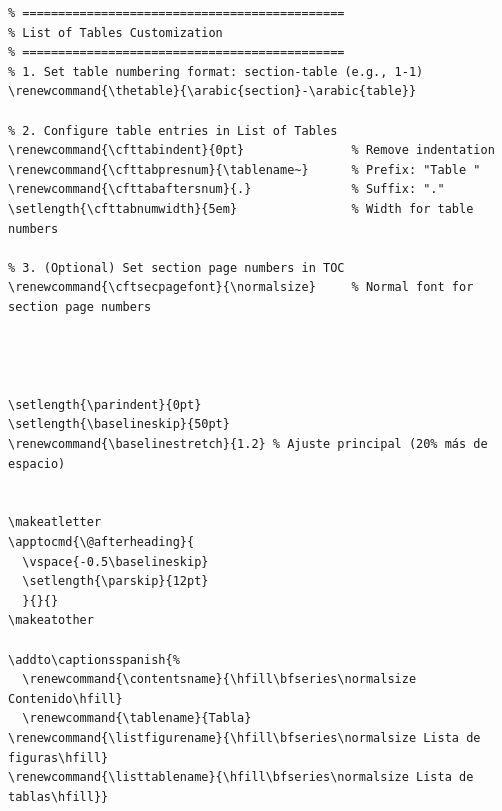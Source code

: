 \documentclass{reporti}
\begin{document}
\begin{verbatim}
% =============================================
% List of Tables Customization
% =============================================
% 1. Set table numbering format: section-table (e.g., 1-1)
\renewcommand{\thetable}{\arabic{section}-\arabic{table}}

% 2. Configure table entries in List of Tables
\renewcommand{\cfttabindent}{0pt}               % Remove indentation
\renewcommand{\cfttabpresnum}{\tablename~}      % Prefix: "Table "
\renewcommand{\cfttabaftersnum}{.}              % Suffix: "."
\setlength{\cfttabnumwidth}{5em}                % Width for table numbers

% 3. (Optional) Set section page numbers in TOC
\renewcommand{\cftsecpagefont}{\normalsize}     % Normal font for section page numbers




\setlength{\parindent}{0pt}
\setlength{\baselineskip}{50pt}
\renewcommand{\baselinestretch}{1.2} % Ajuste principal (20% más de espacio)


\makeatletter
\apptocmd{\@afterheading}{
  \vspace{-0.5\baselineskip}
  \setlength{\parskip}{12pt}
  }{}{}
\makeatother

\addto\captionsspanish{%
  \renewcommand{\contentsname}{\hfill\bfseries\normalsize Contenido\hfill}
  \renewcommand{\tablename}{Tabla}
\renewcommand{\listfigurename}{\hfill\bfseries\normalsize Lista de figuras\hfill}
\renewcommand{\listtablename}{\hfill\bfseries\normalsize Lista de tablas\hfill}}


\end{verbatim}
\end{document}
